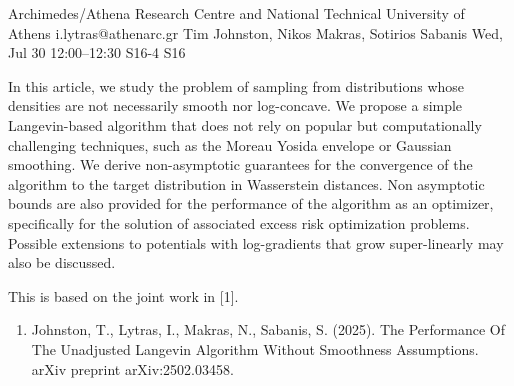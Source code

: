 \begin{talk}
  {Archimedes/Athena Research Centre and National Technical University of Athens}%
  {i.lytras@athenarc.gr}%
  {Tim Johnston, Nikos Makras, Sotirios Sabanis}%
  {}%
  {}%
  {}%
  {Wed, Jul 30 12:00--12:30}%
  {S16-4}%
  {S16}%
  
    
   
In this article, we study the problem of sampling from distributions whose densities are not necessarily smooth nor log-concave. We propose a simple Langevin-based algorithm that does not rely on popular but computationally challenging techniques, such as the Moreau Yosida envelope or Gaussian smoothing. We derive non-asymptotic guarantees for the convergence of the algorithm to the target distribution in Wasserstein distances. Non asymptotic bounds are also provided for the performance of the algorithm as an optimizer, specifically for the solution of associated excess risk optimization problems.\\
Possible extensions to potentials with log-gradients that grow super-linearly may also be discussed.

This is based on the joint work in [1].
\medskip

\begin{enumerate}
    \item [{[1]}] Johnston, T., Lytras, I., Makras, N., Sabanis, S. (2025). The Performance Of The Unadjusted Langevin Algorithm Without Smoothness Assumptions. arXiv preprint arXiv:2502.03458.
\end{enumerate}
\end{talk}

